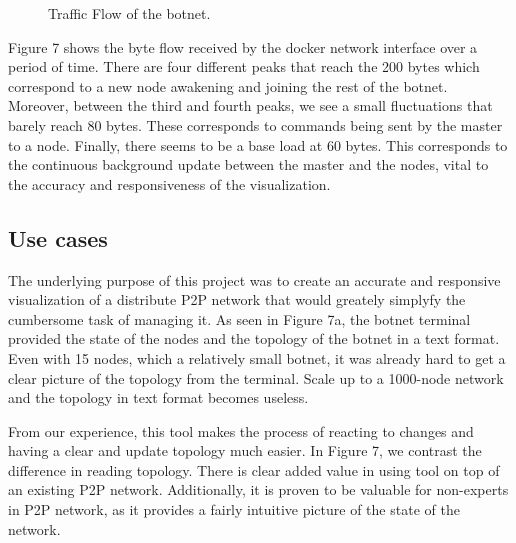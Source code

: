 \documentclass{proc}
\begin{document}
\begin{figure}
\centering
  \caption{Traffic Flow of the botnet.}
  \label{fig1 :bots.csv}
\end{figure}

Figure 7 shows the byte flow received by the docker network interface over a period of time. There are four different peaks that reach the 200 bytes which correspond to a new node awakening and joining the rest of the botnet. Moreover, between the third and fourth peaks, we see a small fluctuations that barely reach 80 bytes. These corresponds to commands being sent by the master to a node. Finally, there seems to be a base load at 60 bytes. This corresponds to the continuous background update between the master and the nodes, vital to the accuracy and responsiveness of the visualization. 


\subsection{Use cases}
The underlying purpose of this project was to create an accurate and responsive visualization of a distribute P2P network that would greately simplyfy the cumbersome task of managing it. As seen in Figure 7a, the botnet terminal provided the state of the nodes and the topology of the botnet in a text format. Even with 15 nodes, which a relatively small botnet, it was already hard to get a clear picture of the topology from the terminal. Scale up to a 1000-node network and the topology in text format becomes useless. 

From our experience, this tool makes the process of reacting to changes and having a clear and update topology much easier. In Figure 7, we contrast the difference in reading topology. There is clear added value in using tool on top of an existing P2P network. Additionally, it is proven to be valuable for non-experts in P2P network, as it provides a fairly intuitive picture of the state of the network. 
\end{document}
